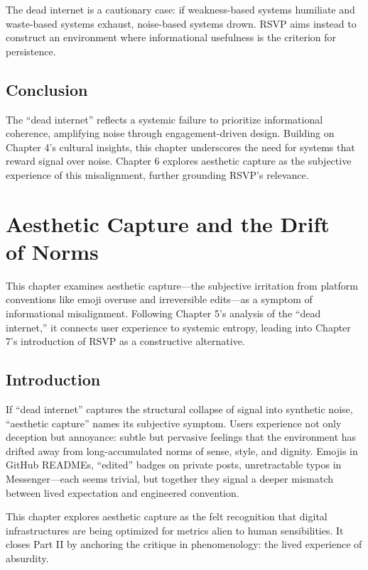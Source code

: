 \documentclass[openany]{book}
\begin{document}
The dead internet is a cautionary case: if weakness-based systems humiliate and waste-based systems exhaust, noise-based systems drown. RSVP aims instead to construct an environment where informational usefulness is the criterion for persistence.

\section{Conclusion}

The ``dead internet'' reflects a systemic failure to prioritize informational coherence, amplifying noise through engagement-driven design. Building on Chapter 4’s cultural insights, this chapter underscores the need for systems that reward signal over noise. Chapter 6 explores aesthetic capture as the subjective experience of this misalignment, further grounding RSVP’s relevance.

\chapter{Aesthetic Capture and the Drift\\ of Norms}

This chapter examines aesthetic capture---the subjective irritation from platform conventions like emoji overuse and irreversible edits---as a symptom of informational misalignment. Following Chapter 5’s analysis of the ``dead internet,'' it connects user experience to systemic entropy, leading into Chapter 7’s introduction of RSVP as a constructive alternative.

\section{Introduction}

If ``dead internet'' captures the structural collapse of signal into synthetic noise, ``aesthetic capture'' names its subjective symptom. Users experience not only deception but annoyance: subtle but pervasive feelings that the environment has drifted away from long-accumulated norms of sense, style, and dignity. Emojis in GitHub READMEs, ``edited'' badges on private posts, unretractable typos in Messenger---each seems trivial, but together they signal a deeper mismatch between lived expectation and engineered convention.

This chapter explores aesthetic capture as the felt recognition that digital infrastructures are being optimized for metrics alien to human sensibilities. It closes Part II by anchoring the critique in phenomenology: the lived experience of absurdity.
\end{document}
